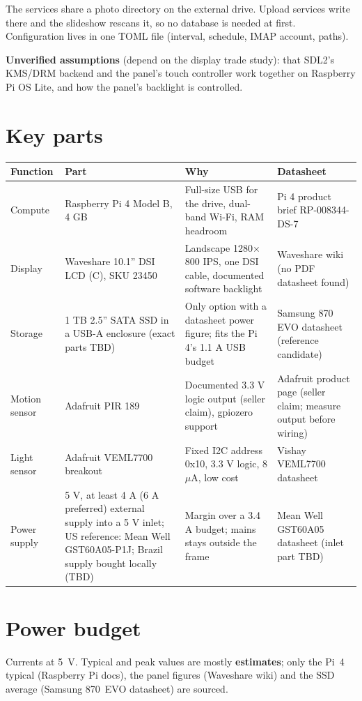 \documentclass[11pt,a4paper]{article}
\begin{document}
The services share a photo directory on the external drive. Upload services write there and the slideshow rescans it, so no database is needed at first. Configuration lives in one TOML file (interval, schedule, IMAP account, paths).

\textbf{Unverified assumptions} (depend on the display trade study): that SDL2's KMS/DRM backend and the panel's touch controller work together on Raspberry Pi OS Lite, and how the panel's backlight is controlled.

\section{Key parts}
\begin{longtable}{p{2.2cm} p{3.6cm} p{5cm} p{3.6cm}}
\toprule
\textbf{Function} & \textbf{Part} & \textbf{Why} & \textbf{Datasheet} \\
\midrule
Compute & Raspberry Pi 4 Model B, 4 GB & Full-size USB for the drive, dual-band Wi-Fi, RAM headroom & Pi 4 product brief RP-008344-DS-7 \\
Display & Waveshare 10.1'' DSI LCD (C), SKU 23450 & Landscape 1280$\times$800 IPS, one DSI cable, documented software backlight & Waveshare wiki (no PDF datasheet found) \\
Storage & 1 TB 2.5'' SATA SSD in a USB-A enclosure (exact parts TBD) & Only option with a datasheet power figure; fits the Pi 4's 1.1 A USB budget & Samsung 870 EVO datasheet (reference candidate) \\
Motion sensor & Adafruit PIR 189 & Documented 3.3 V logic output (seller claim), gpiozero support & Adafruit product page (seller claim; measure output before wiring) \\
Light sensor & Adafruit VEML7700 breakout & Fixed I2C address 0x10, 3.3 V logic, 8 $\mu$A, low cost & Vishay VEML7700 datasheet \\
Power supply & 5 V, at least 4 A (6 A preferred) external supply into a 5 V inlet; US reference: Mean Well GST60A05-P1J; Brazil supply bought locally (TBD) & Margin over a 3.4 A budget; mains stays outside the frame & Mean Well GST60A05 datasheet (inlet part TBD) \\
\bottomrule
\end{longtable}

\section{Power budget}\label{sec:power}
Currents at 5~V. Typical and peak values are mostly \textbf{estimates}; only the Pi~4 typical (Raspberry Pi docs), the panel figures (Waveshare wiki) and the SSD average (Samsung 870~EVO datasheet) are sourced.
\end{document}
